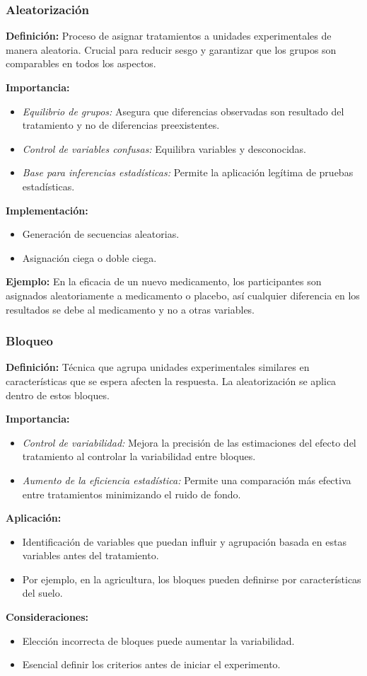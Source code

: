 ﻿\documentclass{beamer}
\begin{document}
\begin{frame}
\frametitle{Aleatorización}
\textbf{Definición:} Proceso de asignar tratamientos a unidades experimentales de manera aleatoria. Crucial para reducir  sesgo y garantizar que los grupos son comparables en todos los aspectos.

\textbf{Importancia:}
\begin{itemize}
    \item \textit{Equilibrio de grupos:} Asegura que diferencias observadas son resultado del tratamiento y no de diferencias preexistentes.
    \item \textit{Control de variables confusas:} Equilibra variables y desconocidas.
    \item \textit{Base para inferencias estadísticas:} Permite la aplicación legítima de pruebas estadísticas.
\end{itemize}

\textbf{Implementación:}
\begin{itemize}
    \item Generación de secuencias aleatorias.
    \item Asignación ciega o doble ciega.
\end{itemize}

\textbf{Ejemplo:} En la eficacia de un nuevo medicamento, los participantes son asignados aleatoriamente a medicamento o placebo, así cualquier diferencia en los resultados se debe al medicamento y no a otras variables.
\end{frame}

\begin{frame}
\frametitle{Bloqueo}
\textbf{Definición:} Técnica que agrupa unidades experimentales similares en características que se espera afecten la respuesta. La aleatorización se aplica dentro de estos bloques.

\textbf{Importancia:}
\begin{itemize}
    \item \textit{Control de variabilidad:} Mejora la precisión de las estimaciones del efecto del tratamiento al controlar la variabilidad entre bloques.
    \item \textit{Aumento de la eficiencia estadística:} Permite una comparación más efectiva entre tratamientos minimizando el ruido de fondo.
\end{itemize}

\textbf{Aplicación:}
\begin{itemize}
    \item Identificación de variables que puedan influir y agrupación basada en estas variables antes del tratamiento.
    \item Por ejemplo, en la agricultura, los bloques pueden definirse por características del suelo.
\end{itemize}

\textbf{Consideraciones:}
\begin{itemize}
    \item Elección incorrecta de bloques puede aumentar la variabilidad.
    \item Esencial definir los criterios antes de iniciar el experimento.
\end{itemize}
\end{frame}
\end{document}
